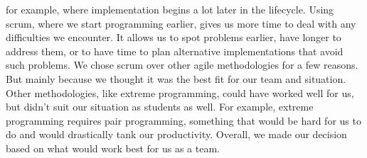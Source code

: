            for example, where implementation begins a lot later in the lifecycle. Using scrum, where we start
            programming earlier, gives us more time to deal with any difficulties we encounter. It allows us to spot
            problems earlier, have longer to address them, or to have time to plan alternative implementations that
            avoid such problems. We chose scrum over other agile methodologies for a few reasons. But mainly because we
            thought it was the best fit for our team and situation. Other methodologies, like extreme programming, could
            have worked well for us, but didn’t suit our situation as students as well. For example, extreme programming
            requires pair programming, something that would be hard for us to do and would drastically tank our
            productivity. Overall, we made our decision based on what would work best for us as a team.

    

